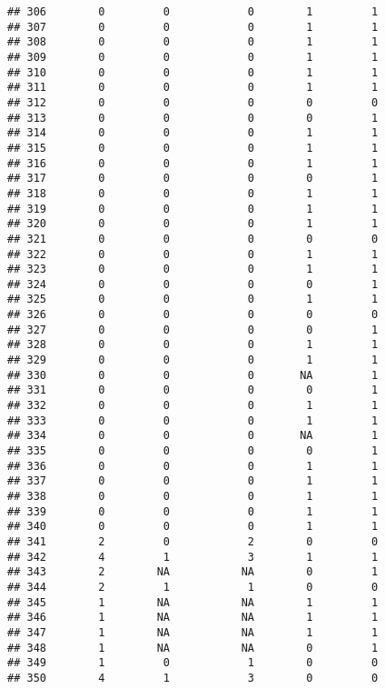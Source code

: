 \documentclass[
]{article}
\begin{document}
\begin{verbatim}
## 306        0         0            0        1         1
## 307        0         0            0        1         1
## 308        0         0            0        1         1
## 309        0         0            0        1         1
## 310        0         0            0        1         1
## 311        0         0            0        1         1
## 312        0         0            0        0         0
## 313        0         0            0        0         1
## 314        0         0            0        1         1
## 315        0         0            0        1         1
## 316        0         0            0        1         1
## 317        0         0            0        0         1
## 318        0         0            0        1         1
## 319        0         0            0        1         1
## 320        0         0            0        1         1
## 321        0         0            0        0         0
## 322        0         0            0        1         1
## 323        0         0            0        1         1
## 324        0         0            0        0         1
## 325        0         0            0        1         1
## 326        0         0            0        0         0
## 327        0         0            0        0         1
## 328        0         0            0        1         1
## 329        0         0            0        1         1
## 330        0         0            0       NA         1
## 331        0         0            0        0         1
## 332        0         0            0        1         1
## 333        0         0            0        1         1
## 334        0         0            0       NA         1
## 335        0         0            0        0         1
## 336        0         0            0        1         1
## 337        0         0            0        1         1
## 338        0         0            0        1         1
## 339        0         0            0        1         1
## 340        0         0            0        1         1
## 341        2         0            2        0         0
## 342        4         1            3        1         1
## 343        2        NA           NA        0         1
## 344        2         1            1        0         0
## 345        1        NA           NA        1         1
## 346        1        NA           NA        1         1
## 347        1        NA           NA        1         1
## 348        1        NA           NA        0         1
## 349        1         0            1        0         0
## 350        4         1            3        0         0

\end{verbatim}
\end{document}
